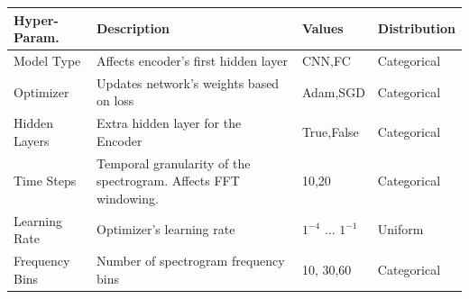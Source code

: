 \documentclass[runningheads,a4paper]{llncs}
\begin{document}
\begin{appendices}
\begin{table}[htbp]
\begin{tabular}{|p{28mm}|p{50mm}|p{21mm}|p{21mm}|}
\hline
Hyper-Param. & Description  & Values & Distribution\\ \hline
Model Type      &   Affects encoder's first hidden layer & CNN,FC & Categorical \\  \hline
Optimizer       & Updates network's weights based on loss & Adam,SGD & Categorical  \\  \hline
Hidden Layers   & Extra hidden layer for the Encoder & True,False & Categorical \\  \hline
Time Steps & Temporal granularity of the spectrogram. Affects FFT windowing. & 10,20 & Categorical  \\ \hline
Learning Rate   &    Optimizer's learning rate  & $1^{-4}$ ... $1^{-1}$ & Uniform      \\ \hline
Frequency Bins & Number of spectrogram frequency bins & 10, 30,60 & Categorical \\ \hline


\end{tabular}
\end{table}
\end{appendices}
\end{document}
